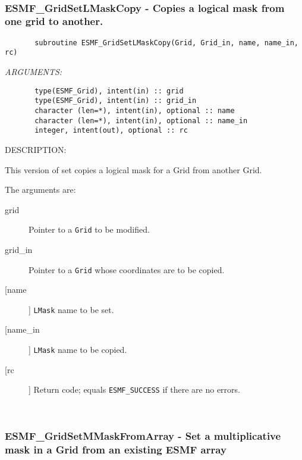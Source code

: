  
\mbox{}\hrulefill\ 
 
\subsubsection{ESMF\_GridSetLMaskCopy - Copies a logical mask from one grid to another.}


 
\begin{verbatim}       subroutine ESMF_GridSetLMaskCopy(Grid, Grid_in, name, name_in, rc)\end{verbatim}{\em ARGUMENTS:}
\begin{verbatim}       type(ESMF_Grid), intent(in) :: grid
       type(ESMF_Grid), intent(in) :: grid_in
       character (len=*), intent(in), optional :: name
       character (len=*), intent(in), optional :: name_in
       integer, intent(out), optional :: rc\end{verbatim}
{\sf DESCRIPTION:\\ }


       This version of set copies a logical mask for a Grid from another Grid.
  
       The arguments are:
       \begin{description}
       \item[grid]
            Pointer to a {\tt Grid} to be modified.
       \item[grid\_in]
            Pointer to a {\tt Grid} whose coordinates are to be copied.
       \item [[name]]
             {\tt LMask} name to be set.
       \item [[name\_in]]
             {\tt LMask} name to be copied.
       \item[[rc]]
            Return code; equals {\tt ESMF\_SUCCESS} if there are no errors.
       \end{description}
   
 
\mbox{}\hrulefill\ 
 
\subsubsection{ESMF\_GridSetMMaskFromArray - Set a multiplicative mask in a Grid from an existing ESMF array}


